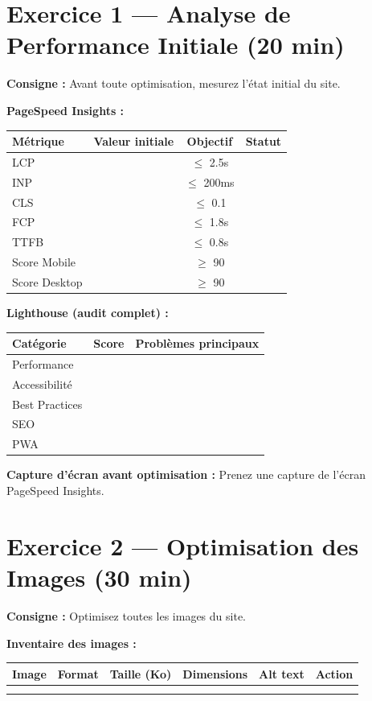 \documentclass[12pt,a4paper]{report}
\begin{document}
\section{Exercice 1 --- Analyse de Performance Initiale (20 min)}

\textbf{Consigne :} Avant toute optimisation, mesurez l'état initial du site.

\textbf{PageSpeed Insights :}
\begin{tabular}{|l|c|c|c|}
\hline
\textbf{Métrique} & \textbf{Valeur initiale} & \textbf{Objectif} & \textbf{Statut} \\
\hline
LCP & & $\le$ 2.5s & \\
\hline
INP & & $\le$ 200ms & \\
\hline
CLS & & $\le$ 0.1 & \\
\hline
FCP & & $\le$ 1.8s & \\
\hline
TTFB & & $\le$ 0.8s & \\
\hline
Score Mobile & & $\ge$ 90 & \\
\hline
Score Desktop & & $\ge$ 90 & \\
\hline
\end{tabular}

\textbf{Lighthouse (audit complet) :}
\begin{tabular}{|l|c|l|}
\hline
\textbf{Catégorie} & \textbf{Score} & \textbf{Problèmes principaux} \\
\hline
Performance & & \\
\hline
Accessibilité & & \\
\hline
Best Practices & & \\
\hline
SEO & & \\
\hline
PWA & & \\
\hline
\end{tabular}

\textbf{Capture d'écran avant optimisation :} Prenez une capture de l'écran PageSpeed Insights.

\section{Exercice 2 --- Optimisation des Images (30 min)}

\textbf{Consigne :} Optimisez toutes les images du site.

\textbf{Inventaire des images :}
\begin{tabular}{|l|l|c|c|l|l|}
\hline
\textbf{Image} & \textbf{Format} & \textbf{Taille (Ko)} & \textbf{Dimensions} & \textbf{Alt text} & \textbf{Action} \\
\hline
 & & & & & \\
\hline
 & & & & & \\
\hline
\end{tabular}
\end{document}
